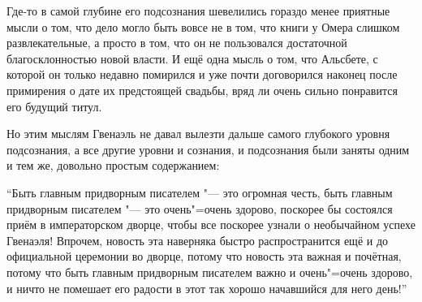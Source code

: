Где-то в самой глубине его подсознания шевелились гораздо менее приятные мысли о
том, что дело могло быть вовсе не в том, что книги у Омера слишком
развлекательные, а просто в том, что он не пользовался достаточной
благосклонностью новой власти.
И ещё одна мысль о том, что Альсбете, с которой он только недавно помирился и
уже почти договорился наконец после примирения о дате их предстоящей свадьбы,
вряд ли очень сильно понравится его будущий титул.

Но этим мыслям Гвенаэль не давал вылезти дальше самого глубокого уровня
подсознания, а все другие уровни и сознания, и подсознания были заняты одним и
тем же, довольно простым содержанием:

\enquote{Быть главным придворным писателем "--- это огромная честь, быть главным
придворным писателем "--- это очень"=очень здорово, поскорее бы состоялся приём
в императорском дворце, чтобы все поскорее узнали о необычайном успехе Гвенаэля!
Впрочем, новость эта наверняка быстро распространится ещё и до официальной
церемонии во дворце, потому что новость эта важная и почётная, потому что быть
главным придворным писателем важно и очень"=очень здорово, и ничто не помешает
его радости в этот так хорошо начавшийся для него день!}
